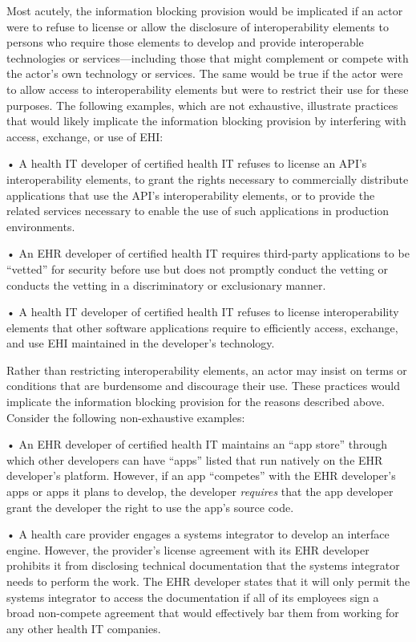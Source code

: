 \documentclass[twoside,11pt]{article}
\begin{document}
          Most acutely, the information blocking provision would be implicated if an actor were to refuse to license or allow the disclosure of interoperability elements to persons who require those elements to develop and provide interoperable technologies or services—including those that might complement or compete with the actor's own technology or services. The same would be true if the actor were to allow access to interoperability elements but were to restrict their use for these purposes. The following examples, which are not exhaustive, illustrate practices that would likely implicate the information blocking provision by interfering with access, exchange, or use of EHI:


          • A health IT developer of certified health IT refuses to license an API's interoperability elements, to grant the rights necessary to commercially distribute applications that use the API's interoperability elements, or to provide the related services necessary to enable the use of such applications in production environments.


          • An EHR developer of certified health IT requires third-party applications to be “vetted” for security before use but does not promptly conduct the vetting or conducts the vetting in a discriminatory or exclusionary manner.



          • A health IT developer of certified health IT refuses to license interoperability elements that other software applications require to efficiently access, exchange, and use  \ifhmode\expandafter\xspace\fi EHI maintained in the developer's technology.


          Rather than restricting interoperability elements, an actor may insist on terms or conditions that are burdensome and discourage their use. These practices would implicate the information blocking provision for the reasons described above. Consider the following non-exhaustive examples:



          • An EHR developer of certified health IT maintains an “app store” through which other developers can have “apps” listed that run natively on the EHR developer's platform. However, if an app “competes” with the EHR developer's apps or apps it plans to develop, the developer \emph{requires} that the app developer grant the developer the right to use the app's source code.


          • A health care provider engages a systems integrator to develop an interface engine. However, the provider's license agreement with its EHR developer prohibits it from disclosing technical documentation that the systems integrator needs to perform the work. The EHR developer states that it will only permit the systems integrator to access the documentation if all of its employees sign a broad non-compete agreement that would effectively bar them from working for any other health IT companies.
\end{document}
